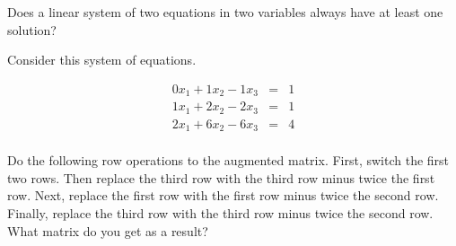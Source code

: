 \endedxproblem


Does a linear system of two equations in two variables always have at least one solution?



\endedxproblem






Consider this system of equations.  



\begin{eqnarray*}
0x_1 + 1x_2 - 1x_3 & = & 1 \\
1x_1 + 2x_2 - 2x_3 & = & 1 \\
2x_1 + 6x_2 - 6x_3 & = & 4 \\
\end{eqnarray*}





Do the following row operations to the augmented matrix.  First, switch the first two
rows.  Then replace the third row with the third
row minus twice the first row.  Next, replace the first row with the first
row minus twice the second row.  Finally, replace the third row with the third
row minus twice the second row.  What matrix do you get as a result?  







